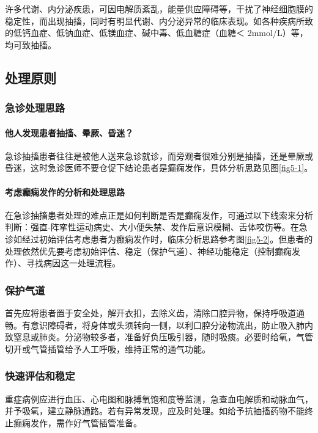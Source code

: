 许多代谢、内分泌疾患，可因电解质紊乱，能量供应障碍等，干扰了神经细胞膜的稳定性，而出现抽搐，同时有明显代谢、内分泌异常的临床表现。如各种疾病所致的低钙血症、低钠血症、低镁血症、碱中毒、低血糖症（血糖＜
2mmol/L）等，均可致抽搐。

\subsection{处理原则}

\subsubsection{急诊处理思路}

\paragraph{他人发现患者抽搐、晕厥、昏迷？}

急诊抽搐患者往往是被他人送来急诊就诊，而旁观者很难分别是抽搐，还是晕厥或昏迷，这时急诊医师不要仓促下结论患者是癫痫发作，具体分析思路见图\ref{fig5-1}。

\paragraph{考虑癫痫发作的分析和处理思路}

在急诊抽搐患者处理的难点正是如何判断是否是癫痫发作，可通过以下线索来分析判断：强直-阵挛性运动病史、大小便失禁、发作后意识模糊、舌体咬伤等。在急诊如经过初始评估考虑患者为癫痫发作时，临床分析思路参考图\ref{fig5-2}。但患者的处理依然优先要考虑初始评估、稳定（保护气道）、神经功能稳定（控制癫痫发作）、寻找病因这一处理流程。

\subsubsection{保护气道}

首先应将患者置于安全处，解开衣扣，去除义齿，清除口腔异物，保持呼吸道通畅。有意识障碍者，将身体或头须转向一侧，以利口腔分泌物流出，防止吸入肺内致窒息或肺炎。分泌物较多者，准备好负压吸引器，随时吸痰。必要时给氧，气管切开或气管插管给予人工呼吸，维持正常的通气功能。

\subsubsection{快速评估和稳定}

重症病例应进行血压、心电图和脉搏氧饱和度等监测，急查血电解质和动脉血气，并予吸氧，建立静脉通路。若有异常发现，应及时处理。如给予抗抽搐药物不能终止癫痫发作，需作好气管插管准备。

